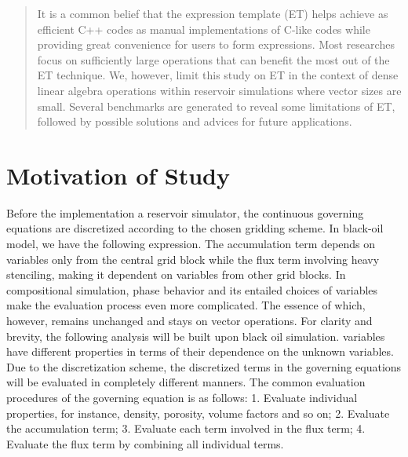 \documentclass[10pt]{article}
\begin{document}
\maketitle

\begin{abstract}
It is a common belief that the expression template (ET) helps achieve as efficient C++ codes as manual implementations of C-like codes while providing great convenience for users to form expressions. Most researches focus on sufficiently large operations that can benefit the most out of the ET technique. We, however, limit this study on ET in the context of dense linear algebra operations within reservoir simulations where vector sizes are small. Several benchmarks are generated to reveal some limitations of ET, followed by possible solutions and advices for future applications.
\end{abstract}

\section{Motivation of Study}
Before the implementation a reservoir simulator, the continuous governing equations are discretized according to the chosen gridding scheme. In black-oil model, we have the following expression. The accumulation term depends on variables only from the central grid block while the flux term involving heavy stenciling, making it dependent on variables from other grid blocks. In compositional simulation, phase behavior and its entailed choices of variables make the evaluation process even more complicated. The essence of which, however, remains unchanged and stays on vector operations. For clarity and brevity, the following analysis will be built upon black oil simulation. 
variables have different properties in terms of their dependence on the unknown variables. Due to the discretization scheme, the discretized terms in the governing equations will be evaluated in completely different manners. The common evaluation procedures of the governing equation is as follows:
1. Evaluate individual properties, for instance, density, porosity, volume factors and so on;
2. Evaluate the accumulation term;
3. Evaluate each term involved in the flux term;
4. Evaluate the flux term by combining all individual terms.
\end{document}
